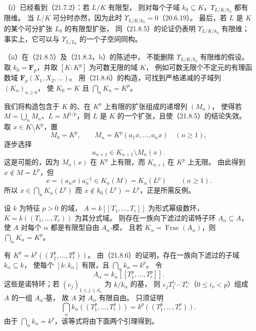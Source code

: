 （i）已经看到（21.7.2）：若 $L/K$ 有限型，
则对每个子域 $k_0\subseteq K$，$\Upsilon_{L/K/k_0}$ 都有限维。
当 $L/K$ 可分时亦然，因为此时 $\Upsilon_{L/K/k_0}=0$（20.6.19）。
最后，若 $L$ 是 $K$ 的某个可分扩张 $L_0$ 的有限型扩张，
同（21.8.5）的论证仍表明 $\Upsilon_{L/K/k_0}$ 有限维；
事实上，它可以与 $\Upsilon_{L/L_0}$ 的一个子空间同构。

（ii）在（21.8.5）及（21.8.3，b）的陈述中，
不能删除 $\Upsilon_{L/K/k_0}$ 有限维的假设。
取 $k_0=\mathbf F_p$，并取 $[K:K^p]$ 为可数无限的域 $K$，
例如可数无限个不定元的有理函数域
$\mathbf F_p(X_1,X_2,\ldots)$。
用（21.8.6）的构造，可找到严格递减的子域列 $(K_n)_{n\ge0}$，
使 $K_0=K$ 且 $\bigcap_nK_n=K^p$。

我们将构造包含于 $K$ 的、在 $K^p$ 上有限的扩张组成的递增列 $(M_n)$，
使得若 $M=\bigcup_nM_n$、$L=M^{1/p}$，则 $L$ 是 $K$ 的一个扩张，且使（21.8.5）的结论失效。
取 $x\in K\setminus K^p$，置
\[
 M_0=K^p,\qquad M_n=K^p(a_1x,\ldots,a_nx)\quad(n\ge1),
\]
逐步选择
\[
 a_{n+1}\in K_{n+1}\setminus M_n(x).
\]
这是可能的，因为 $M_n(x)$ 在 $K^p$ 上有限，而 $K_{n+1}$ 在 $K^p$ 上无限。
由此得到 $x\notin M=L^p$，但
\[
 x=(a_nx)a_n^{-1}\in K_n(M)=K_n(L^p)\qquad(n\ge1).
\]
所以 $x\in\bigcap_nK_n(L^p)$ 而 $x\notin k_0(L^p)=L^p$，正是所需反例。

设 $k$ 为特征 $p>0$ 的域，
$A=k[[T_1,\ldots,T_r]]$ 为形式幂级数环，
$K=k((T_1,\ldots,T_r))$ 为其分式域。
则存在一族向下滤过的诺特子环 $A_\alpha\subseteq A$，
使 $A$ 对每个 $\alpha$ 都是有限型自由 $A_\alpha$-模，
且若 $K_\alpha=\operatorname{Frac}(A_\alpha)$，则
$\bigcap_\alpha K_\alpha=K^p$。

\eproof
有 $K^p=k^p((T_1^p,\ldots,T_r^p))$。
由（21.8.6）的证明，存在一族向下滤过的子域 $k_\alpha\subseteq k$，
使每个 $[k:k_\alpha]$ 有限，且 $\bigcap_\alpha k_\alpha=k^p$。
令
\[
 A_\alpha=k_\alpha[[T_1^p,\ldots,T_r^p]].
\]
这些是诺特环；若 $(e_j)_{1\le j\le d_\alpha}$ 为 $k/k_\alpha$ 的基，
则 $e_jT_1^{i_1}\cdots T_r^{i_r}$（$0\le i_\nu<p$）组成 $A$ 的一组 $A_\alpha$-基，
故 $A$ 对 $A_\alpha$ 有限自由。
只须证明
\begin{equation}
 \bigcap_\alpha k_\alpha((T_1^p,\ldots,T_r^p))
 =k^p((T_1^p,\ldots,T_r^p)).
 \tag{21.8.8.1}
\end{equation}
由于 $\bigcap_\alpha k_\alpha=k^p$，该等式将由下面两个引理得到。
\finishproof

